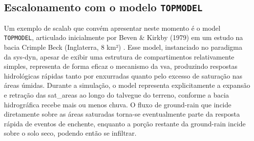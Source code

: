 \documentclass[./main.tex]{subfiles}
\begin{document}
\subsection{Escalonamento com o modelo \texttt{TOPMODEL}} \label{sec:hydro:topmodel}

\par Um exemplo de \gls{scalab} que convém apresentar neste momento é o \gls{model} \texttt{TOPMODEL}, articulado inicialmente por Beven \& Kirkby (1979) em um estudo na bacia Crimple Beck (Inglaterra, 8 km²) \cite{Beven1979a}. Esse \gls{model}, instanciado no \gls{paradigma} da \gls{sys-dyn}, apesar de exibir uma estrutura de compartimentos relativamente simples, representa de forma eficaz o mecanismo da \gls{vsa}, produzindo respostas hidrológicas rápidas tanto por enxurradas quanto pelo excesso de saturação nas áreas úmidas. Durante a simulação, o \gls{model} representa explicitamente a expansão e retração das \gls{sat_areas} ao longo do talvegue do terreno, conforme a bacia hidrográfica recebe mais ou menos chuva. O fluxo de \gls{ground-rain} que incide diretamente sobre as áreas saturadas torna-se eventualmente parte da resposta rápida de eventos de enchente, enquanto a porção restante da \gls{ground-rain} incide sobre o solo seco, podendo então se infiltrar. 
\end{document}
